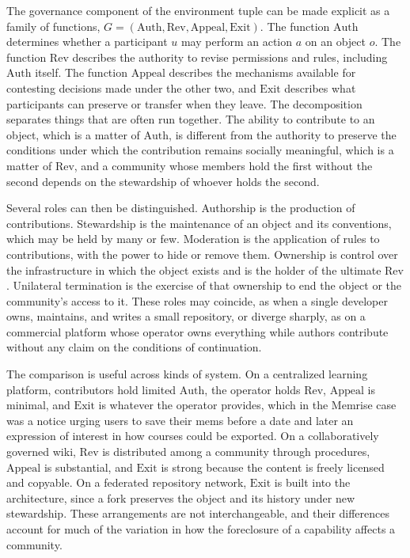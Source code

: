 \documentclass[11pt]{article}
\theoremstyle{remark}
\newcommand{\Gg}{G}
\begin{document}
The governance component of the environment tuple can be made explicit as a family of functions, $\Gg=(\mathrm{Auth},\mathrm{Rev},\mathrm{Appeal},\mathrm{Exit})$. The function $\mathrm{Auth}$ determines whether a participant $u$ may perform an action $a$ on an object $o$. The function $\mathrm{Rev}$ describes the authority to revise permissions and rules, including $\mathrm{Auth}$ itself. The function $\mathrm{Appeal}$ describes the mechanisms available for contesting decisions made under the other two, and $\mathrm{Exit}$ describes what participants can preserve or transfer when they leave. The decomposition separates things that are often run together. The ability to contribute to an object, which is a matter of $\mathrm{Auth}$, is different from the authority to preserve the conditions under which the contribution remains socially meaningful, which is a matter of $\mathrm{Rev}$, and a community whose members hold the first without the second depends on the stewardship of whoever holds the second.

Several roles can then be distinguished. Authorship is the production of contributions. Stewardship is the maintenance of an object and its conventions, which may be held by many or few. Moderation is the application of rules to contributions, with the power to hide or remove them. Ownership is control over the infrastructure in which the object exists and is the holder of the ultimate $\mathrm{Rev}$. Unilateral termination is the exercise of that ownership to end the object or the community's access to it. These roles may coincide, as when a single developer owns, maintains, and writes a small repository, or diverge sharply, as on a commercial platform whose operator owns everything while authors contribute without any claim on the conditions of continuation.

The comparison is useful across kinds of system. On a centralized learning platform, contributors hold limited $\mathrm{Auth}$, the operator holds $\mathrm{Rev}$, $\mathrm{Appeal}$ is minimal, and $\mathrm{Exit}$ is whatever the operator provides, which in the Memrise case was a notice urging users to save their mems before a date and later an expression of interest in how courses could be exported. On a collaboratively governed wiki, $\mathrm{Rev}$ is distributed among a community through procedures, $\mathrm{Appeal}$ is substantial, and $\mathrm{Exit}$ is strong because the content is freely licensed and copyable. On a federated repository network, $\mathrm{Exit}$ is built into the architecture, since a fork preserves the object and its history under new stewardship. These arrangements are not interchangeable, and their differences account for much of the variation in how the foreclosure of a capability affects a community.
\end{document}
